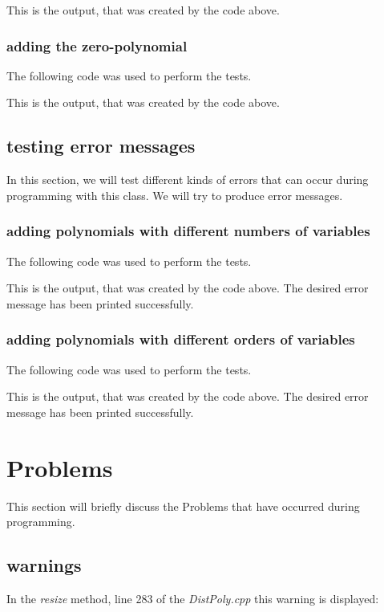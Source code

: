 \documentclass[11pt,titlepage]{article}
\begin{document}
		This is the output, that was created by the code above.
			
\newpage			
		\subsubsection{adding the zero-polynomial}
		The following code was used to perform the tests.
			
		
		This is the output, that was created by the code above.
			
			
\newpage		
	\subsection{testing error messages}
	In this section, we will test different kinds of errors that can occur during programming with this class.
	We will try to produce error messages.
	
		\subsubsection{adding polynomials with different numbers of variables}
		The following code was used to perform the tests.
			
		
		This is the output, that was created by the code above. The desired error message has been printed successfully.
			
			
		\subsubsection{adding polynomials with different orders of variables}
		The following code was used to perform the tests.
			
		
		This is the output, that was created by the code above. The desired error message has been printed successfully.
			
\newpage

		
	\section{Problems}
	This section will briefly discuss the Problems that have occurred during programming.
		\subsection{warnings}
		In the \emph{resize} method, line 283 of the \emph{DistPoly.cpp} this warning is displayed:
		
\end{document}
